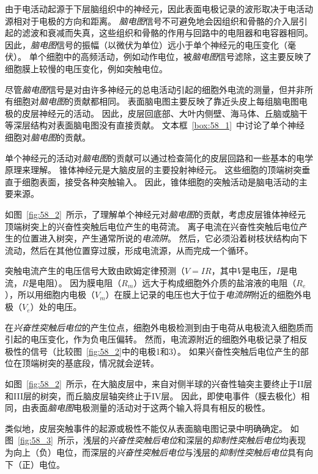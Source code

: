 由于电活动起源于下层脑组织中的神经元，因此表面电极记录的波形取决于电活动源相对于电极的方向和距离。
\textit{脑电图}信号不可避免地会因组织和骨骼的介入层引起的滤波和衰减而失真，这些组织和骨骼的作用与回路中的电阻器和电容器相同。
因此，\textit{脑电图}信号的振幅（以微伏为单位）远小于单个神经元的电压变化（毫伏）。
单个细胞中的高频活动，例如动作电位，被\textit{脑电图}信号滤除，这主要反映了细胞膜上较慢的电压变化，例如突触电位。


尽管\textit{脑电图}信号是对由许多神经元的总电活动引起的细胞外电流的测量，但并非所有细胞对\textit{脑电图}的贡献都相同。
表面脑电图主要反映了靠近头皮上每组脑电图电极的皮层神经元的活动。
因此，皮层回底部、大叶内侧壁、海马体、丘脑或脑干等深层结构对表面脑电图没有直接贡献。
文本框~\ref{box:58_1}~中讨论了单个神经细胞对\textit{脑电图}的贡献。


\begin{proposition}[单个神经元对脑电图的贡献] \label{box:58_1}
	
	\quad \quad 单个神经元的活动对\textit{脑电图}的贡献可以通过检查简化的皮层回路和一些基本的电学原理来理解。
	锥体神经元是大脑皮层的主要投射神经元。
	这些细胞的顶端树突垂直于细胞表面，接受各种突触输入。
	因此，锥体细胞的突触活动是脑电活动的主要来源。
	
	\quad \quad 如图~\ref{fig:58_2}~所示，了理解单个神经元对\textit{脑电图}的贡献，考虑皮层锥体神经元顶端树突上的兴奋性突触后电位产生的电荷流。
	离子电流在兴奋性突触后电位产生的位置进入树突，产生通常所说的\textit{电流阱}。
	然后，它必须沿着树枝状结构向下流动，然后在其他位置穿过膜，形成电流源，从而完成一个循环。
	
	\quad \quad 突触电流产生的电压信号大致由欧姆定律预测（$ V=IR $，其中$ V $是电压，$ I $是电流，$ R $是电阻）。
	因为膜电阻（$R_m$）远大于构成细胞外介质的盐溶液的电阻（$ R_e $），所以用细胞内电极（$ V_m $）在膜上记录的电压也大于位于\textit{电流阱}附近的细胞外电极（$ V_e $）处的电压。
	
	\quad \quad 在\textit{兴奋性突触后电位}的产生位点，细胞外电极检测到由于电荷从电极流入细胞质而引起的电压变化，作为负电压偏转。
	然而，电流源附近的细胞外电极记录了相反极性的信号（比较图~\ref{fig:58_2}中的电极1和3）。
	如果兴奋性突触后电位产生的部位在顶端树突的基底段，情况就会逆转。
	
	\quad \quad 如图~\ref{fig:58_2}~所示，在大脑皮层中，来自对侧半球的兴奋性轴突主要终止于II层和III层的树突，而丘脑皮层轴突终止于IV层。
	因此，即使电事件（膜去极化）相同，由表面\textit{脑电图}电极测量的活动对于这两个输入将具有相反的极性。
	
	\quad \quad 类似地，皮层突触事件的起源或极性不能仅从表面脑电图记录中明确确定。
	如图~\ref{fig:58_3}~所示，浅层的\textit{兴奋性突触后电位}和深层的\textit{抑制性突触后电位}均表现为向上（负）电位，而深层的\textit{兴奋性突触后电位}与浅层的\textit{抑制性突触后电位}具有向下（正）电位。
	
\end{proposition}


